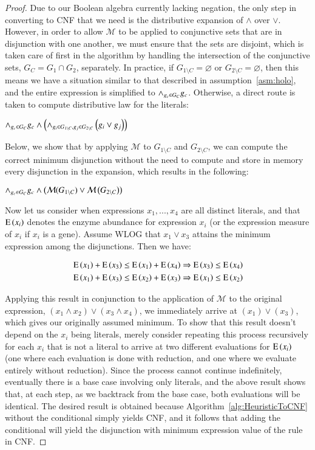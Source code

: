 \begin{proof}
Due to our Boolean algebra currently lacking negation, the only step
in converting to CNF that we need is the distributive expansion of 
$\land$ over $\lor$. However, in order to allow $\mathcal{M}$ to be
applied to conjunctive sets that are in disjunction with one another, 
we must ensure that the sets are disjoint, which is taken care of first
in the algorithm by handling the intersection of the conjunctive sets, 
$G_C = G_1 \cap G_2$, separately. In practice, if $G_{1\setminus C} = \varnothing$
or $G_{2\setminus C} = \varnothing$, then this means we have a situation similar
to that described in assumption~\ref{asm:holo}, and the entire expression
is simplified to $\land_{g_c \in G_C} g_c$. Otherwise, a direct route is 
taken to compute distributive law for the literals: 

$\land_{g_c \in G_C} g_c \land \left(\land_{g_i \in G_{1 \setminus C}, 
g_j \in G_{2\setminus C}} \left(g_i \lor g_j\right) \right)$

Below, we show that by applying $\mathcal{M}$ to $G_{1\setminus C}$
and $G_{2\setminus C}$, we can compute the correct minimum
disjunction without the need to compute and store in memory every 
disjunction in the expansion, which results in the following:

$\land_{g_c \in G_C} g_c \land \left(\mathcal{M}(G_{1 \setminus C}) 
\lor \mathcal{M}\left(G_{2\setminus C}\right)\right)$

Now let us consider when expressions $x_1, ..., x_4$
are all distinct literals, and that
$\operatorname{E}\left(x_i\right)$ denotes the enzyme abundance for expression $x_i$ (or the 
expression measure of $x_i$ if $x_i$ is a gene). Assume
WLOG that $x_1 \lor x_3$ attains the minimum expression among the
disjunctions. Then we have:

\begin{align*}
&\operatorname{E}\left(x_1\right) + \operatorname{E}\left(x_3\right) \leq \operatorname{E}\left(x_1\right) + \operatorname{E}\left(x_4\right) \Rightarrow \operatorname{E}\left(x_3\right) \leq \operatorname{E}\left(x_4\right) \\
&\operatorname{E}\left(x_1\right) + \operatorname{E}\left(x_3\right) \leq \operatorname{E}\left(x_2\right) + \operatorname{E}\left(x_3\right) \Rightarrow \operatorname{E}\left(x_1\right) \leq \operatorname{E}\left(x_2\right) 
\end{align*}

Applying this result in conjunction to the application of $\mathcal{M}$ to
the original expression, $(x_1 \land x_2) \lor (x_3 \land x_4)$, we
immediately arrive at $(x_1) \lor (x_3)$, which gives our originally
assumed minimum. To show that this result doesn't depend on the $x_i$
being literals, merely consider repeating this process recursively for
each $x_i$ that is not a literal to arrive at two different
evaluations for $\operatorname{E}\left(x_i\right)$ (one where each evaluation is done with
reduction, and one where we evaluate entirely without reduction).
Since the process cannot continue indefinitely, eventually there is a
base case involving only literals, and the above result shows that, at
each step, as we backtrack from the base case, both evaluations will
be identical. The desired result is obtained because
Algorithm~\ref{alg:HeuristicToCNF} without the conditional simply yields CNF,
and it follows that adding the conditional will yield the disjunction with
minimum expression value of the rule in CNF.
\end{proof}

